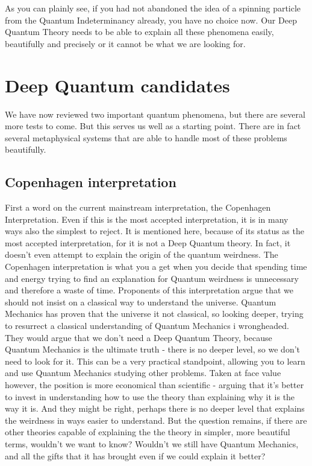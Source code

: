 \documentclass[notitlepage]{report}
\begin{document}
As you can plainly see, if you had not abandoned the idea of a spinning particle from the Quantum Indeterminancy already, you have no choice now. Our Deep Quantum Theory needs to be able to explain all these phenomena easily, beautifully and precisely or it cannot be what we are looking for.



\section*{Deep Quantum candidates}
We have now reviewed two important quantum phenomena, but there are several more tests to come. But this serves us well as a starting point. There are in fact several metaphysical systems that are able to handle most of these problems beautifully. 

\subsection*{Copenhagen interpretation}
First a word on the current mainstream interpretation, the Copenhagen Interpretation. Even if this is the most accepted interpretation, it is in many ways also the simplest to reject. It is mentioned here, because of its status as the most accepted interpretation, for it is not a Deep Quantum theory. In fact, it doesn't even attempt to explain the origin of the quantum weirdness. The Copenhagen interpretation is what you a get when you decide that spending time and energy trying to find an explanation for Quantum weirdness is unnecessary and therefore a waste of time. Proponents of this interpretation argue that we should not insist on a classical way to understand the universe. Quantum Mechanics has proven that the universe it not classical, so looking deeper, trying to resurrect a classical understanding of Quantum Mechanics i wrongheaded. They would argue that we don't need a Deep Quantum Theory, because Quantum Mechanics is the ultimate truth - there is no deeper level, so we don't need to look for it. This can be a very practical standpoint, allowing you to learn and use Quantum Mechanics studying other problems. Taken at face value however, the position is more economical than scientific - arguing that it's better to invest in understanding how to use the theory than explaining why it is the way it is. And they might be right, perhaps there is no deeper level that explains the weirdness in ways easier to understand. But the question remains, if  there are other theories capable of explaining the the theory in simpler, more beautiful terms, wouldn't we want to know? Wouldn't we still have Quantum Mechanics, and all the gifts that it has brought even if we could explain it better?
\end{document}
